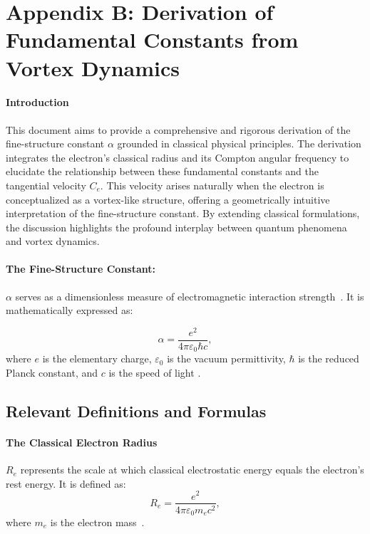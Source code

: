 
\section{Appendix B: Derivation of Fundamental Constants from Vortex Dynamics}


\paragraph*{Introduction}
This document aims to provide a comprehensive and rigorous derivation of the fine-structure constant $\alpha$ grounded in classical physical principles.
The derivation integrates the electron's classical radius and its Compton angular frequency to elucidate the relationship between these fundamental constants and the tangential velocity $C_e$.
This velocity arises naturally when the electron is conceptualized as a vortex-like structure, offering a geometrically intuitive interpretation of the fine-structure constant.
By extending classical formulations, the discussion highlights the profound interplay between quantum phenomena and vortex dynamics.


\paragraph*{The Fine-Structure Constant:}
$\alpha$ serves as a dimensionless measure of electromagnetic interaction strength~\cite{maxwell1861}.
It is mathematically expressed as:

\begin{equation*}
    \alpha = \frac{e^2}{4\pi \varepsilon_0 \hbar c},
\end{equation*}
where $e$ is the elementary charge, $\varepsilon_0$ is the vacuum permittivity, $\hbar$ is the reduced Planck constant, and $c$ is the speed of light \cite{dirac1930quantum}.

\subsection*{Relevant Definitions and Formulas}
\paragraph*{The Classical Electron Radius}
$R_e$ represents the scale at which classical electrostatic energy equals the electron's rest energy. It is defined as:
\begin{equation*}
    R_e = \frac{e^2}{4\pi \varepsilon_0 m_e c^2},
\end{equation*}
where $m_e$ is the electron mass~\cite{helmholtz1858}.

